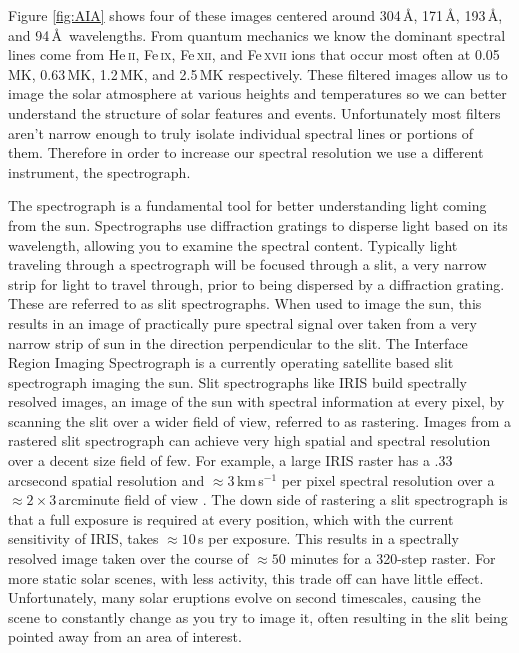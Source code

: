 Figure \ref{fig:AIA} shows four of these images centered around 304\,\AA, 171\,\AA, 193\,\AA, and 94\,\AA\  wavelengths.
From quantum mechanics we know the dominant spectral lines come from He\,\textsc{ii}, Fe\,\textsc{ix}, Fe\,\textsc{xii}, and Fe\,\textsc{xvii}  ions that occur most often at 0.05\,MK, 0.63\,MK, 1.2\,MK, and 2.5\,MK respectively.
These filtered images allow us to image the solar atmosphere at various heights and temperatures so we can better understand the structure of solar features and events.
Unfortunately most filters aren't narrow enough to truly isolate individual spectral lines or portions of them.
Therefore in order to increase our spectral resolution we use a different instrument, the spectrograph.

The spectrograph is a fundamental tool for better understanding light coming from the sun. 
Spectrographs use diffraction gratings to disperse light based on its wavelength, allowing you to examine the spectral content.
Typically light traveling through a spectrograph will be focused through a slit, a very narrow strip for light to travel through, prior to being dispersed by a diffraction grating.
These are referred to as slit spectrographs.  
When used to image the sun, this results in an image of practically pure spectral signal over taken from a very narrow strip of sun in the direction perpendicular to the slit.
The Interface Region Imaging Spectrograph \citep[IRIS:][]{IRIS} is a currently operating satellite based slit spectrograph imaging the sun.
Slit spectrographs like IRIS build spectrally resolved images, an image of the sun with spectral information at every pixel, by scanning the slit over a wider field of view, referred to as rastering.
Images from a rastered slit spectrograph can achieve very high spatial and spectral resolution over a decent size field of few.
For example, a large IRIS raster has a .33 arcsecond spatial resolution and $\approx3$\,km\,s$^{-1}$ per pixel spectral resolution over a $\approx2\times3$\,arcminute field of view \citep{DePontieu2021}.
The down side of rastering a slit spectrograph is that a full exposure is required at every position, which with the current sensitivity of IRIS, takes $\approx10$\,s per exposure.
This results in a spectrally resolved image taken over the course of $\approx50$ minutes for a 320-step raster. 
For more static solar scenes, with less activity, this trade off can have little effect.
Unfortunately, many solar eruptions evolve on second timescales, causing the scene to constantly change as you try to image it, often resulting in the slit being pointed away from an area of interest.

